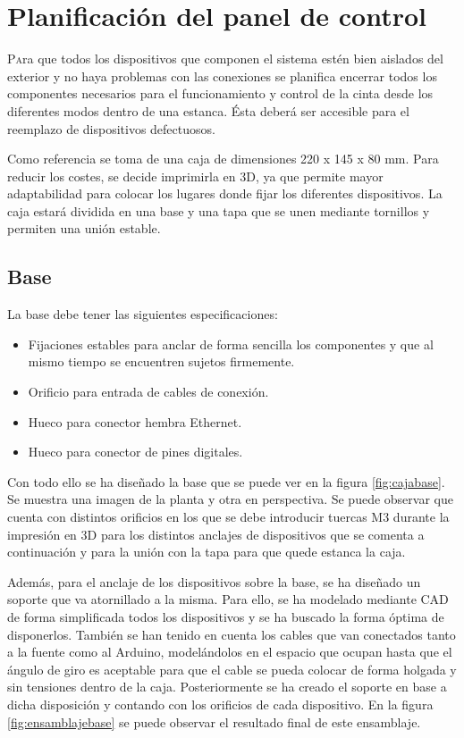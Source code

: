 \chapter{Planificación del panel de control}\label{chp-04}

\lettrine[lraise=-0.1, lines=2, loversize=0.2]{P}ara que todos los dispositivos que componen el sistema estén bien aislados del exterior y no haya problemas con las conexiones se planifica encerrar todos los componentes necesarios para el funcionamiento y control de la cinta desde los diferentes modos dentro de una estanca. Ésta deberá ser accesible para el reemplazo de dispositivos defectuosos.

Como referencia se toma de una caja de dimensiones 220 x 145 x 80 mm. Para reducir los 
costes, se decide imprimirla en 3D, ya que permite mayor adaptabilidad para colocar 
los lugares donde fijar los diferentes dispositivos. La caja estará dividida en una base y una 
tapa que se unen mediante tornillos y permiten una unión estable.

\section{Base}

La base debe tener las siguientes especificaciones:
\begin{itemize}
    \item Fijaciones estables para anclar de forma sencilla los componentes y que al mismo tiempo se encuentren sujetos firmemente. 
    \item Orificio para entrada de cables de conexión.
    \item Hueco para conector hembra Ethernet.
    \item Hueco para conector de pines digitales.
\end{itemize} 

Con todo ello se ha diseñado la base que se puede ver en la figura \ref{fig:cajabase}. Se muestra una imagen de la planta y otra en perspectiva. Se puede observar que cuenta con distintos orificios en los que se debe introducir tuercas M3 durante la impresión en 3D para los distintos anclajes de dispositivos que se comenta a continuación y para la unión con la tapa para que quede estanca la caja.

Además, para el anclaje de los dispositivos sobre la base, se ha diseñado un soporte que va atornillado a la misma. Para ello, se ha modelado mediante CAD de forma simplificada todos los dispositivos y se ha buscado la forma óptima de disponerlos. También se han tenido en cuenta los cables que van conectados tanto a la fuente como al Arduino, modelándolos en el espacio que ocupan hasta que el ángulo de giro es aceptable para que el cable se pueda colocar de forma holgada y sin tensiones dentro de la caja. Posteriormente se ha creado el soporte en base a dicha disposición y contando con los orificios de cada dispositivo. En la figura \ref{fig:ensamblajebase} se puede observar el resultado final de este ensamblaje.

